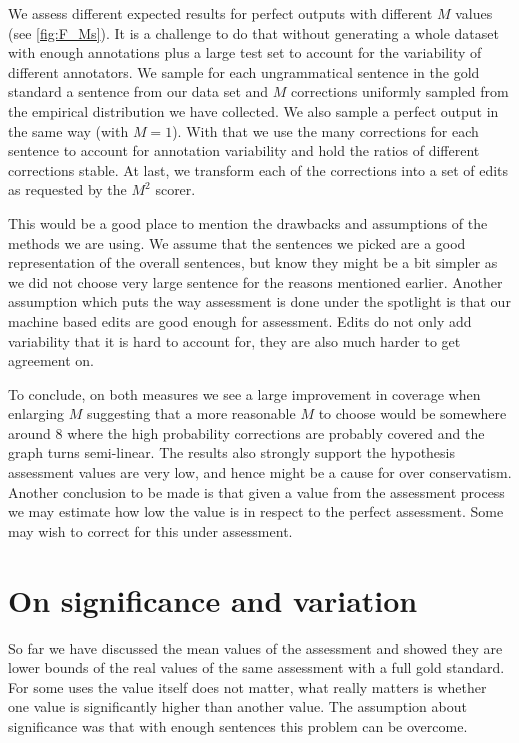 \documentclass[english]{article}
\begin{document}
{We assess different expected results for perfect outputs with different $M$ values (see \ref{fig:F_Ms}). It is a challenge to do that without generating a whole dataset with enough annotations plus a large test set to account for the variability of different annotators. We sample for each ungrammatical sentence in the gold standard a sentence from our data set and $M$ corrections uniformly sampled from the empirical distribution we have collected. We also sample a perfect output in the same way (with $M=1$). With that we use the many corrections for each sentence to account for annotation variability and hold the ratios of different corrections stable. At last, we transform each of the corrections into a set of edits as requested by the $M^2$ scorer\cite{dahlmeier2012better}.  

This would be a good place to mention the drawbacks and assumptions of the methods we are using. We assume that the sentences we picked are a good representation of the overall sentences, but know they might be a bit simpler as we did not choose very large sentence for the reasons mentioned earlier. Another assumption which puts the way assessment is done under the spotlight is that our machine based edits are good enough for assessment. Edits do not only add variability that it is hard to account for, they are also much harder to get agreement on. 

To conclude, on both measures we see a large improvement in coverage when enlarging $M$ suggesting that a more reasonable $M$ to choose would be somewhere around 8 where the high probability corrections are probably covered and the graph turns semi-linear. The results also strongly support the hypothesis assessment values are very low, and hence might be a cause for over conservatism.
 Another conclusion to be made is that given a value from the assessment process we may estimate how low the value is in respect to the perfect assessment. Some may wish to correct for this under assessment.

\section{On significance and variation}

So far we have discussed the mean values of the assessment and showed they are lower bounds of the real values of the same assessment with a full gold standard. For some uses the value itself does not matter, what really matters is whether one value is significantly higher than another value. The assumption about significance was that with enough sentences this problem can be overcome.

}
\end{document}
